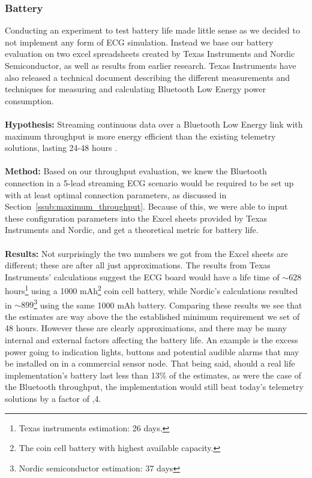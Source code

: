 
\subsubsection{Battery} %
\label{ssub:battery}

Conducting an experiment to test battery life made little sense as we decided to not implement any form of ECG simulation. Instead we base our battery evaluation on two excel spreadsheets created by Texas Instruments and Nordic Semiconductor, as well as results from earlier research. Texas Instruments have also released a technical document \cite{TIbatteryCalculations} describing the different measurements and techniques for measuring and calculating Bluetooth Low Energy power consumption.
\\
\\
\noindent %
\textbf{Hypothesis:} Streaming continuous data over a Bluetooth Low Energy link with maximum throughput is more energy efficient than the existing telemetry solutions, lasting 24-48 hours \cite{philipsIntellivueTrancievers}.
\\
\\
\noindent
\textbf{Method:} Based on our throughput evaluation, we knew the  Bluetooth connection in a 5-lead streaming ECG scenario would be required to be set up with at least optimal connection parameters, as discussed in Section~\ref{ssub:maximum_throughput}. Because of this, we were able to input these configuration parameters into the Excel sheets provided by Texas Instruments and Nordic, and get a theoretical metric for battery life.
\\
\\
\noindent
\textbf{Results:} 
Not surprisingly the two numbers we got from the Excel sheets are different; these are after all just approximations. The results from Texas Instruments' calculations suggest the ECG board would have a life time of $\sim628$ hours\footnote{ Texas instruments estimation: 26 days.} using a 1000 mAh\footnote{ The coin cell battery with highest available capacity.} coin cell battery, while Nordic's calculations resulted in $\sim899$\footnote{ Nordic semiconductor estimation: 37 days} using the same 1000 mAh battery. Comparing these results we see that the estimates are way above the the established minimum requirement we set of 48 hours. However these are clearly approximations, and there may be many internal and external factors affecting the battery life. An example is the excess power going to indication lights, buttons and potential audible alarms that may be installed on in a commercial sensor node. That being said, should a real life implementation's battery last less than 13\% of the estimates, as were the case of the Bluetooth throughput, the implementation would still beat today's telemetry solutions by a factor of ,4.

